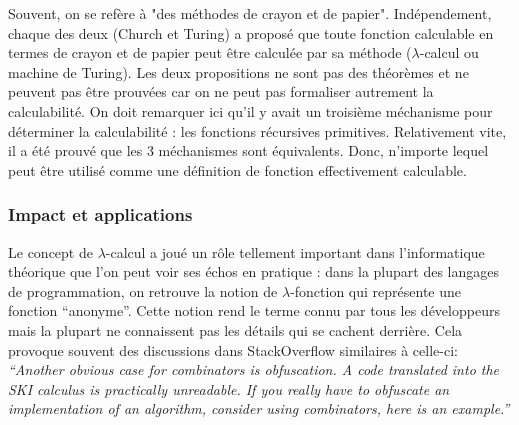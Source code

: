 \documentclass[12pt, a4paper]{article}
\begin{document}
Souvent, on se refère à "des méthodes de crayon et de papier". Indépendement, chaque des deux (Church et Turing) a proposé que toute fonction calculable en termes de crayon et de papier peut être calculée par sa méthode ($\lambda$-calcul ou machine de Turing). Les deux propositions ne sont pas des théorèmes et ne peuvent pas être prouvées car on ne peut pas formaliser autrement la calculabilité. On doit remarquer ici qu'il y avait un troisième méchanisme pour déterminer la calculabilité : les fonctions récursives primitives. Relativement vite, il a été prouvé que les 3 méchanismes sont équivalents. Donc, n'importe lequel peut être utilisé comme une définition de fonction effectivement calculable.

\subsubsection*{Impact et applications}
Le concept de $\lambda$-calcul a joué un rôle tellement important dans l'informatique théorique que l'on peut voir ses échos en pratique : dans la plupart des langages de programmation, on retrouve la notion de $\lambda$-fonction qui représente une fonction ``anonyme''.
Cette notion rend le terme connu par tous les développeurs mais la plupart ne connaissent pas les détails qui se cachent derrière.
Cela provoque souvent des discussions dans StackOverflow similaires à celle-ci:
\textit{``Another obvious case for combinators is obfuscation. A code translated into the SKI calculus is practically unreadable. If you really have to obfuscate an implementation of an algorithm, consider using combinators, here is an example.''}
\end{document}
